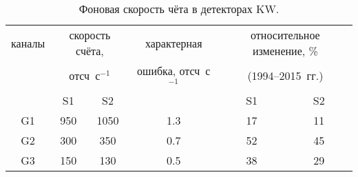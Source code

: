 \begin{table} [h]
 \centering
 \caption{Фоновая скорость чёта в детекторах KW.}
 \label{tab:bg_cnt_rate}
\scriptsize
  \begin{center}
  \begin{tabular}{c c c c c c}
  \hline
  \hline
каналы & \multicolumn{2}{c}{скорость счёта,} & характерная        & \multicolumn{2}{c}{относительное изменение, \% }\\
  & \multicolumn{2}{c}{отсч~с$^{-1}$} &   ошибка, отсч~с$^{-1}$   & \multicolumn{2}{c}{(1994--2015~гг.)}\\
       &  S1        &    S2      &                        & S1        &    S2      \\       
\hline
G1 &   950  & 1050  & 1.3 & 17 & 11\\ 
G2 &   300  & 350   & 0.7 & 52 & 45\\ 
G3 &   150  & 130   & 0.5 & 38 & 29\\ 
\hline
\end{tabular}
\end{center}
\end{table}